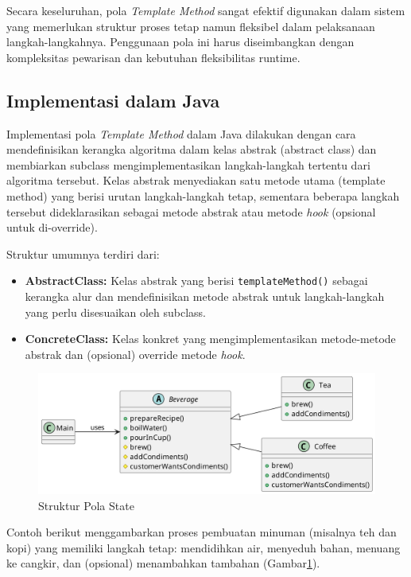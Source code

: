 Secara keseluruhan, pola \textit{Template Method} sangat efektif digunakan dalam sistem yang memerlukan struktur proses tetap namun fleksibel dalam pelaksanaan langkah-langkahnya. Penggunaan pola ini harus diseimbangkan dengan kompleksitas pewarisan dan kebutuhan fleksibilitas runtime.

\subsection{Implementasi dalam Java}

Implementasi pola \textit{Template Method} dalam Java dilakukan dengan cara mendefinisikan kerangka algoritma dalam kelas abstrak (abstract class) dan membiarkan subclass mengimplementasikan langkah-langkah tertentu dari algoritma tersebut. Kelas abstrak menyediakan satu metode utama (template method) yang berisi urutan langkah-langkah tetap, sementara beberapa langkah tersebut dideklarasikan sebagai metode abstrak atau metode \textit{hook} (opsional untuk di-override).

Struktur umumnya terdiri dari:
\begin{itemize}
	\item \textbf{AbstractClass:} Kelas abstrak yang berisi \texttt{templateMethod()} sebagai kerangka alur dan mendefinisikan metode abstrak untuk langkah-langkah yang perlu disesuaikan oleh subclass.
	\item \textbf{ConcreteClass:} Kelas konkret yang mengimplementasikan metode-metode abstrak dan (opsional) override metode \textit{hook}.
\end{itemize}


\begin{figure}[h]
	\centering
	\includegraphics[width=\textwidth]{../figures/out/template_method.png}
	\caption{Struktur Pola State}
	\label{fig:template_method}
\end{figure}


Contoh berikut menggambarkan proses pembuatan minuman (misalnya teh dan kopi) yang memiliki langkah tetap: mendidihkan air, menyeduh bahan, menuang ke cangkir, dan (opsional) menambahkan tambahan (Gambar\ref{fig:template_method}).

